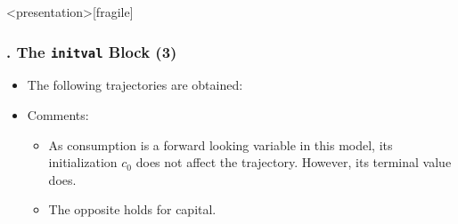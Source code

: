 \documentclass[11pt,aspectratio=169]{beamer}
\begin{document}
\begin{frame}<presentation>[fragile]
	\frametitle{{\thesection.\thesubsection\thinspace\thesubsubsection} The \texttt{initval} Block (3)}
	\begin{itemize}
		\item The following trajectories are obtained:
		\begin{figure}
			\centering
			\qquad
			\qquad
		\end{figure}
		\item Comments:
			\begin{itemize}
				\item As consumption is a forward looking variable in this model, its initialization $c_0$ does not affect the trajectory. However, its terminal value does.
				\item The opposite holds for capital. 
			\end{itemize}
	\end{itemize}
\end{frame}
\end{document}

